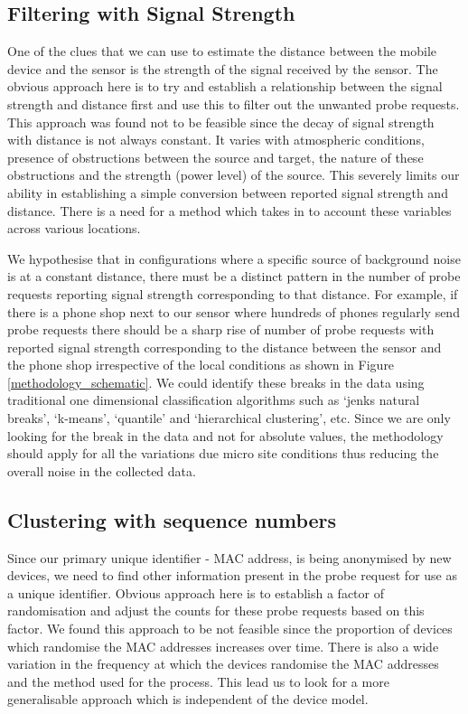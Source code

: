 \subsection{Filtering with Signal Strength}
One of the clues that we can use to estimate the distance between the mobile device and the sensor is the strength of the signal received by the sensor. 
The obvious approach here is to try and establish a relationship between the signal strength and distance first and use this to filter out the unwanted probe requests.
This approach was found not to be feasible since the decay of signal strength with distance is not always constant.
It varies with atmospheric conditions, presence of obstructions between the source and target, the nature of these obstructions and the strength (power level) of the source.
This severely limits our ability in establishing a simple conversion between reported signal strength and distance.
There is a need for a method which takes in to account these variables across various locations.

We hypothesise that in configurations where a specific source of background noise is at a constant distance, there must be a distinct pattern in the number of probe requests reporting signal strength corresponding to that distance.
For example, if there is a phone shop next to our sensor where hundreds of phones regularly send probe requests there should be a sharp rise of number of probe requests with reported signal strength corresponding to the distance between the sensor and the phone shop irrespective of the local conditions as shown in Figure \ref{methodology_schematic}.
We could identify these breaks in the data using traditional one dimensional classification algorithms such as `jenks natural breaks', `k-means', `quantile' and `hierarchical clustering', etc.
Since we are only looking for the break in the data and not for absolute values, the methodology should apply for all the variations due micro site conditions thus reducing the overall noise in the collected data.

\subsection{Clustering with sequence numbers}

Since our primary unique identifier - MAC address, is being anonymised by new devices, we need to find other information present in the probe request for use as a unique identifier.
Obvious approach here is to establish a factor of randomisation and adjust the counts for these probe requests based on this factor.
We found this approach to be not feasible since the proportion of devices which randomise the MAC addresses increases over time.
There is also a wide variation in the frequency at which the devices randomise the MAC addresses and the method used for the process.
This lead us to look for a more generalisable approach which is independent of the device model.


